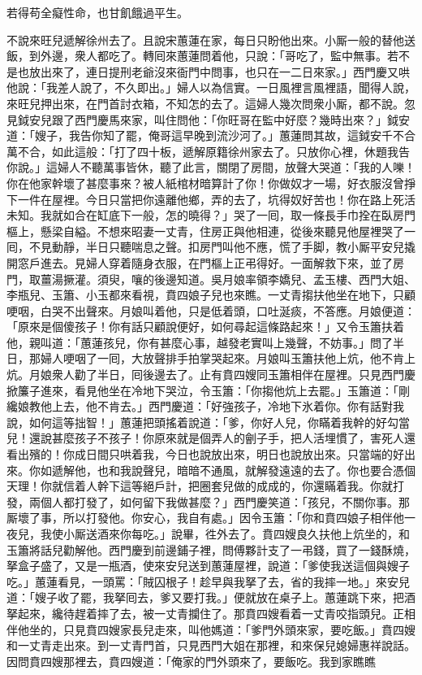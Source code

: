 \begin{myquote}
若得苟全癡性命，也甘飢餓過平生。
\end{myquote}

不說來旺兒遞解徐州去了。且說宋蕙蓮在家，每日只盼他出來。小厮一般的替他送飯，到外邊，衆人都吃了。轉囘來蕙蓮問着他，只說：「哥吃了，監中無事。若不是也放出來了，連日提刑老爺沒來衙門中問事，也只在一二日來家。」西門慶又哄他說：「我差人說了，不久即出。」婦人以為信實。一日風裡言風裡語，聞得人說，來旺兒押出來，在門首討衣箱，不知怎的去了。這婦人幾次問衆小厮，都不說。忽見鉞安兒跟了西門慶馬來家，叫住問他：「你旺哥在監中好麼？幾時出來？」鉞安道：「嫂子，我告你知了罷，俺哥這早晚到流沙河了。」蕙蓮問其故，這鉞安千不合萬不合，如此這般：「打了四十板，遞解原籍徐州家去了。只放你心裡，休題我告你說。」這婦人不聽萬事皆休，聽了此言，關閉了房間，放聲大哭道：「我的人嚛！你在他家幹壞了甚麼事來？被人紙棺材暗算計了你！你做奴才一場，好衣服沒曾掙下一件在屋裡。今日只當把你遠離他鄉，弄的去了，坑得奴好苦也！你在路上死活未知。我就如合在缸底下一般，怎的曉得？」{}哭了一囘，取一條長手巾拴在臥房門樞上，懸梁自縊。不想來昭妻一丈青，住房正與他相連，從後來聽見他屋裡哭了一囘，不見動靜，半日只聽喘息之聲。扣房門叫他不應，慌了手脚，教小厮平安兒撬開窓戶進去。見婦人穿着隨身衣服，在門樞上正弔得好。一面解救下來，並了房門，取薑湯撅灌。須臾，嚷的後邊知道。吳月娘率領李嬌兒、孟玉樓、西門大姐、李瓶兒、玉簫、小玉都來看視，賁四娘子兒也來瞧。一丈青搊扶他坐在地下，只顧哽咽，白哭不出聲來。月娘叫着他，只是低着頭，口吐涎痰，不答應。月娘便道：「原來是個傻孩子！你有話只顧說便好，如何尋起這條路起來！」又令玉簫扶着他，親叫道：「蕙蓮孩兒，你有甚麼心事，越發老實叫上幾聲，不妨事。」{}問了半日，那婦人哽咽了一囘，大放聲排手拍掌哭起來。月娘叫玉簫扶他上炕，他不肯上炕。月娘衆人勸了半日，囘後邊去了。止有賁四嫂同玉簫相伴在屋裡。只見西門慶掀簾子進來，看見他坐在冷地下哭泣，令玉簫：「你搊他炕上去罷。」玉簫道：「剛纔娘教他上去，他不肯去。」西門慶道：「好強孩子，冷地下氷着你。你有話對我說，如何這等拙智！」蕙蓮把頭搖着說道：「爹，你好人兒，你瞞着我幹的好勾當兒！還說甚麼孩子不孩子！你原來就是個弄人的劊子手，把人活埋慣了，害死人還看出殯的！{}你成日間只哄着我，今日也說放出來，明日也說放出來。只當端的好出來。你如遞解他，也和我說聲兒，暗暗不通風，就解發遠遠的去了。你也要合憑個天理！你就信着人幹下這等絕戶計，把圈套兒做的成成的，你還瞞着我。你就打發，兩個人都打發了，如何留下我做甚麼？」{}西門慶笑道：「孩兒，不關你事。那厮壞了事，所以打發他。你安心，我自有處。」因令玉簫：「你和賁四娘子相伴他一夜兒，我使小厮送酒來你每吃。」說畢，徃外去了。賁四嫂良久扶他上炕坐的，和玉簫將話兒勸解他。西門慶到前邊鋪子裡，問傅夥計支了一弔錢，買了一錢酥燒，拏盒子盛了，又是一瓶酒，使來安兒送到蕙蓮屋裡，說道：「爹使我送這個與嫂子吃。」蕙蓮看見，一頭罵：「賊囚根子！趁早與我拏了去，省的我摔一地。」{}來安兒道：「嫂子收了罷，我拏囘去，爹又要打我。」便就放在桌子上。蕙蓮跳下來，把酒拏起來，纔待趕着摔了去，被一丈青攔住了。那賁四嫂看着一丈青咬指頭兒。正相伴他坐的，只見賁四嫂家長兒走來，叫他媽道：「爹門外頭來家，要吃飯。」賁四嫂和一丈青走出來。到一丈青門首，只見西門大姐在那裡，和來保兒媳婦惠祥說話。因問賁四嫂那裡去，賁四嫂道：「俺家的門外頭來了，要飯吃。我到家瞧瞧